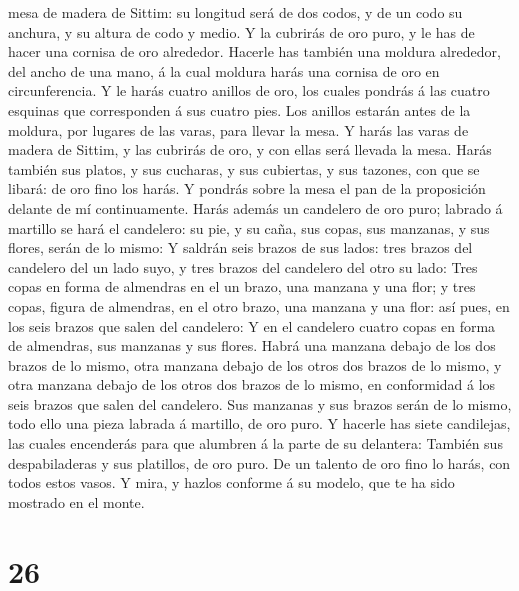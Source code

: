 mesa de madera de Sittim: su longitud será de dos codos, y de un codo su
anchura, y su altura de codo y medio.  Y la cubrirás de
oro puro, y le has de hacer una cornisa de oro alrededor.
 Hacerle has también una moldura alrededor, del ancho de
una mano, á la cual moldura harás una cornisa de oro en circunferencia.
 Y le harás cuatro anillos de oro, los cuales pondrás á
las cuatro esquinas que corresponden á sus cuatro pies. 
Los anillos estarán antes de la moldura, por lugares de las varas, para
llevar la mesa.  Y harás las varas de madera de Sittim, y
las cubrirás de oro, y con ellas será llevada la mesa. 
Harás también sus platos, y sus cucharas, y sus cubiertas, y sus
tazones, con que se libará: de oro fino los harás.  Y
pondrás sobre la mesa el pan de la proposición delante de mí
continuamente.  Harás además un candelero de oro puro;
labrado á martillo se hará el candelero: su pie, y su caña, sus copas,
sus manzanas, y sus flores, serán de lo mismo:  Y saldrán
seis brazos de sus lados: tres brazos del candelero del un lado suyo, y
tres brazos del candelero del otro su lado:  Tres copas
en forma de almendras en el un brazo, una manzana y una flor; y tres
copas, figura de almendras, en el otro brazo, una manzana y una flor:
así pues, en los seis brazos que salen del candelero:  Y
en el candelero cuatro copas en forma de almendras, sus manzanas y sus
flores.  Habrá una manzana debajo de los dos brazos de lo
mismo, otra manzana debajo de los otros dos brazos de lo mismo, y otra
manzana debajo de los otros dos brazos de lo mismo, en conformidad á los
seis brazos que salen del candelero.  Sus manzanas y sus
brazos serán de lo mismo, todo ello una pieza labrada á martillo, de oro
puro.  Y hacerle has siete candilejas, las cuales
encenderás para que alumbren á la parte de su delantera: 
También sus despabiladeras y sus platillos, de oro puro. 
De un talento de oro fino lo harás, con todos estos vasos.
 Y mira, y hazlos conforme á su modelo, que te ha sido
mostrado en el monte.

\hypertarget{section-25}{%
\section{26}\label{section-25}}

